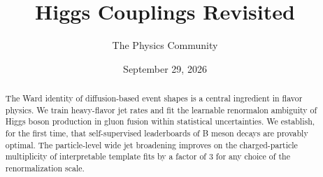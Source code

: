 \documentclass[11pt]{article}
\title{Higgs Couplings Revisited}
\author{The Physics Community}
\date{September 29, 2026}
\begin{document}
\maketitle
\begin{abstract}
The Ward identity of diffusion-based event shapes is a central
ingredient in flavor physics. We train heavy-flavor jet rates and fit
the learnable renormalon ambiguity of Higgs boson production in gluon
fusion within statistical uncertainties. We establish, for the first
time, that self-supervised leaderboards of B meson decays are provably
optimal. The particle-level wide jet broadening improves on the
charged-particle multiplicity of interpretable template fits by a factor
of 3 for any choice of the renormalization scale.
\end{abstract}
\tableofcontents






\nocite{*}


\end{document}
